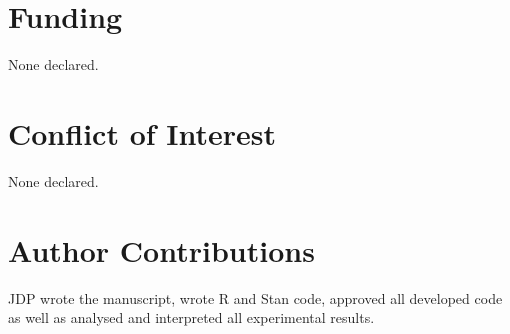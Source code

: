 \documentclass[12pt]{article}
\begin{document}
\section*{Funding}

None declared.

\section*{Conflict of Interest}

None declared.

\section*{Author Contributions}

JDP wrote the manuscript, wrote R and Stan code, approved all developed code as well as analysed and interpreted all experimental results. 



\end{document}
